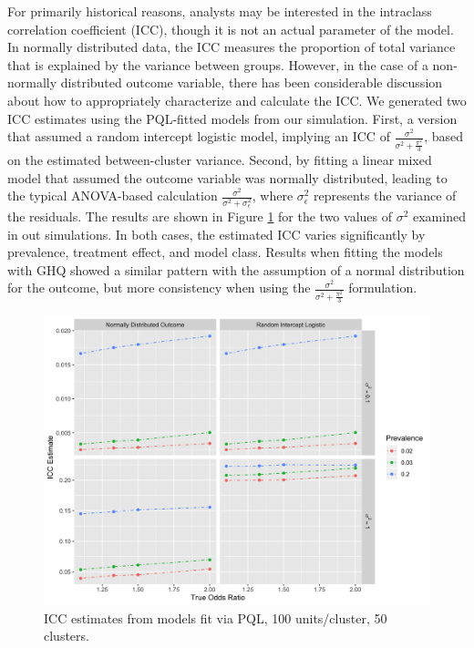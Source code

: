 \documentclass[Afour,times,sagev,doublespace]{sagej}
\begin{document}
For primarily historical reasons, analysts may be interested in the intraclass correlation coefficient (ICC), though it is not an actual parameter of the model. In normally distributed data, the ICC measures the proportion of total variance that is explained by the variance between groups. However, in the case of a non-normally distributed outcome variable, there has been considerable discussion about how to appropriately characterize and calculate the ICC\cite{wu_comparison_2012}\cite{nakagawa_shinichi_coefficient_2017}. We generated two ICC estimates using the PQL-fitted models from our simulation.  First, a version that assumed a random intercept logistic model, implying an ICC of $\frac{\sigma^2}{\sigma^2+\frac{\pi^2}{3}}$, based on the estimated between-cluster variance. Second, by fitting a linear mixed model that assumed the outcome variable was normally distributed, leading to the typical ANOVA-based calculation $\frac{\sigma^2}{\sigma^2+\sigma^2_{\epsilon}}$, where $\sigma^2_{\epsilon}$ represents the variance of the residuals. The results are shown in Figure \ref{fig:_icc} for the two values of $\sigma^2$ examined in out simulations. In both cases, the estimated ICC varies significantly by prevalence, treatment effect, and model class. Results when fitting the models with GHQ showed a similar pattern with the assumption of a normal distribution for the outcome, but more consistency when using the $\frac{\sigma^2}{\sigma^2+\frac{\pi^2}{3}}$ formulation. 

\begin{figure}[]
\centering
\includegraphics[width=\linewidth]{_icc_p100_n50.png}
  \caption{ICC estimates from models fit via PQL, 100 units/cluster, 50 clusters.}
    \label{fig:_icc}
\end{figure}
\end{document}
